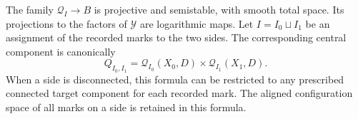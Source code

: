 \begin{lemma}
\label{ev:configuration}
The family $\mathcal Q_I\to B$ is projective and semistable, with
smooth total space.  Its projections to the factors of $\mathcal Y$
are logarithmic maps.  Let $I=I_0\sqcup I_1$ be an assignment of the
recorded marks to the two sides.  The corresponding central component
is canonically
\begin{equation}
\label{ev:component-product}
  Q_{I_0,I_1}
  =\mathcal Q_{I_0}(X_0,D)\times
    \mathcal Q_{I_1}(X_1,D).
\end{equation}
When a side is disconnected, this formula can be restricted to any
prescribed connected target component for each recorded mark.
The aligned configuration space of all marks on a side is retained
in this formula.
\end{lemma}

